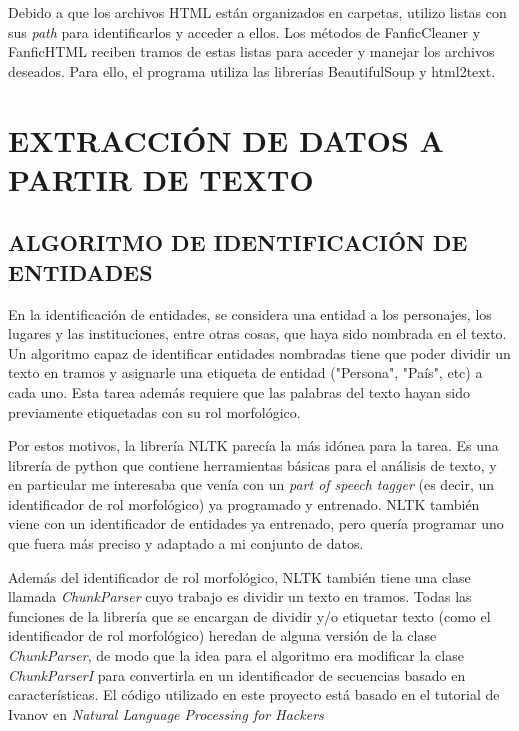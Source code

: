 \documentclass{pre-tfg}
\begin{document}
Debido a que los archivos HTML están organizados en carpetas, utilizo listas con sus \textit{path} para identificarlos y acceder a ellos. Los métodos de FanficCleaner y FanficHTML reciben tramos de estas listas para acceder y manejar los archivos deseados.
Para ello, el programa utiliza las librerías BeautifulSoup y html2text.

\section {EXTRACCIÓN DE DATOS A PARTIR DE TEXTO}

\subsection{ALGORITMO DE IDENTIFICACIÓN DE ENTIDADES}

En la identificación de entidades, se considera una entidad a los personajes, los lugares y las instituciones, entre otras cosas, que haya sido nombrada en el texto. Un algoritmo capaz de identificar entidades nombradas tiene que poder dividir un texto en tramos y asignarle una etiqueta de entidad ("Persona", "País", etc) a cada uno. Esta tarea además requiere que las palabras del texto hayan sido previamente etiquetadas con su rol morfológico.

Por estos motivos, la librería NLTK parecía la más idónea para la tarea. Es una librería de python que contiene herramientas básicas para el análisis de texto, y en particular me interesaba que venía con un \textit{part of speech tagger} (es decir, un identificador de rol morfológico) ya programado y entrenado. NLTK también viene con un identificador de entidades ya entrenado, pero quería programar uno que fuera más preciso y adaptado a mi conjunto de datos.

Además del identificador de rol morfológico, NLTK también tiene una clase llamada \textit{ChunkParser} cuyo trabajo es dividir un texto en tramos. Todas las funciones de la librería que se encargan de dividir y/o etiquetar texto (como el identificador de rol morfológico) heredan de alguna versión de la clase \textit{ChunkParser}, de modo que la idea para el algoritmo era modificar la clase \textit{ChunkParserI} para convertirla en un identificador de secuencias basado en características. El código utilizado en este proyecto está basado en el tutorial de Ivanov en \textit{Natural Language Processing for Hackers} \cite{ivanov_2016}
\end{document}
